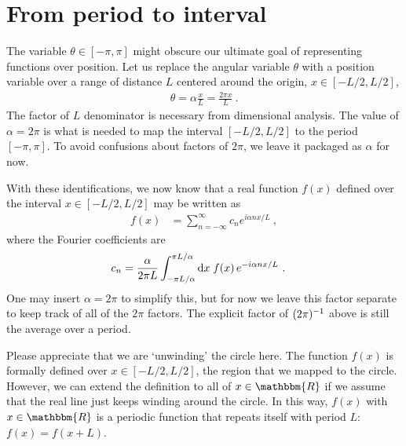 \documentclass[12pt, oneside]{report}    %
\let\oldsection\section
\def\section{%
  \setcounter{sidenote}{1}%
  \oldsection
}
\begin{document}
\section{From period to interval}

The variable $\theta \in [-\pi, \pi]$ might obscure our ultimate goal of representing functions over position. Let us replace the angular variable $\theta$ with a position variable over a range of distance $L$ centered around the origin, $x \in [-{L}/{2},L/2]$,
\begin{align}
    \theta = \alpha \frac{x}{L} = \frac{2\pi x}{L} \ .
\end{align}
The factor of $L$ denominator is necessary from dimensional analysis. The value of $\alpha = 2\pi$ is what is needed to map the interval $[-L/2,L/2]$ to the period $[-\pi,\pi]$. To avoid confusions about factors of $2\pi$, we leave it packaged as $\alpha$ for now. 

With these identifications, we now know that a real {function} $f(x)$ defined over the interval $x\in[-L/2,L/2]$ may be written as
\begin{align}
    f(x) &= \sum_{n=-\infty}^\infty c_n e^{i\alpha n x/L} \ ,
    \label{eq:fourier:interval:complex}
\end{align}
where the Fourier coefficients are
\begin{align}
    c_n &= \frac{\alpha}{2\pi L} \int_{-\pi L/\alpha}^{\pi L/\alpha} \operatorname{d}\!{x}\; f(x)\, e^{-i\alpha n x/L} \ .
    \label{eq:fourier:interval:complex:coefficient}
\end{align}
One may insert $\alpha = 2\pi$ to simplify this, but for now we leave this factor separate to keep track of all of the $2\pi$ factors. The explicit factor of $(2\pi)^{-1}$ above is still the average over a period.


\begin{exercise}
Please appreciate that we are `unwinding' the circle here. The function $f(x)$ is formally defined over $x\in[-L/2,L/2]$, the region that we mapped to the circle. However, we can extend the definition to all of $x\in \mathbbm{R}$ if we assume that the real line just keeps winding around the circle. In this way, $f(x)$ with $x\in \mathbbm{R}$ is a periodic function that repeats itself with period $L$: $f(x) = f(x+L)$.
\end{exercise}
\end{document}
